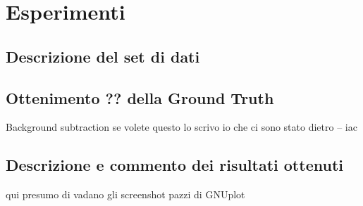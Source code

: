 
\chapter{Esperimenti}
\section{Descrizione del set di dati}
\section{Ottenimento ?? della Ground Truth}
Background subtraction se volete questo lo scrivo io che ci sono stato dietro -- iac
\section{Descrizione e commento dei risultati ottenuti}
qui presumo di vadano gli screenshot pazzi di GNUplot

